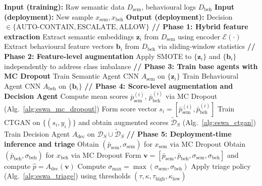 \begin{algorithm}[ht]
\caption{Agentic SABRE: Training and Deployment Pipeline}
\label{alg:eswa_pipeline}
\begin{algorithmic}[1]
    \State \textbf{Input (training):} Raw semantic data $D_{\text{sem}}$, behavioural logs $D_{\text{beh}}$
    \State \textbf{Input (deployment):} New sample $x_{\text{sem}}, x_{\text{beh}}$
    \State \textbf{Output (deployment):} Decision $\in \{\text{AUTO-CONTAIN}, \text{ESCALATE}, \text{ALLOW}\}$
    \Statex \textbf{// Phase 1: Hybrid feature extraction}
    \State Extract semantic embeddings $\mathbf{z}_i$ from $D_{\text{sem}}$ using encoder $\mathcal{E}(\cdot)$
    \State Extract behavioural feature vectors $\mathbf{b}_i$ from $D_{\text{beh}}$ via sliding-window statistics
    \Statex \textbf{// Phase 2: Feature-level augmentation}
    \State Apply SMOTE to $\{\mathbf{z}_i\}$ and $\{\mathbf{b}_i\}$ independently to address class imbalance
    \Statex \textbf{// Phase 3: Train base agents with MC Dropout}
    \State Train Semantic Agent CNN $A_{\text{sem}}$ on $\{\mathbf{z}_i\}$
    \State Train Behavioural Agent CNN $A_{\text{beh}}$ on $\{\mathbf{b}_i\}$
    \Statex \textbf{// Phase 4: Score-level augmentation and Decision Agent}
        \State Compute mean scores $\bar{p}_{\text{sem}}^{(i)}$, $\bar{p}_{\text{beh}}^{(i)}$ via MC Dropout (Alg.~\ref{alg:eswa_mc_dropout})
        \State Form score vector $s_i = [\bar{p}_{\text{sem}}^{(i)}, \bar{p}_{\text{beh}}^{(i)}]$
    \EndFor
    \State Train CTGAN on $\{(s_i, y_i)\}$ and obtain augmented scores $\tilde{\mathcal{D}}_S$ (Alg.~\ref{alg:eswa_ctgan})
    \State Train Decision Agent $A_{\text{dec}}$ on $\mathcal{D}_S \cup \tilde{\mathcal{D}}_S$
    \Statex \textbf{// Phase 5: Deployment-time inference and triage}
    \State Obtain $(\bar{p}_{\text{sem}}, \sigma_{\text{sem}})$ for $x_{\text{sem}}$ via MC Dropout
    \State Obtain $(\bar{p}_{\text{beh}}, \sigma_{\text{beh}})$ for $x_{\text{beh}}$ via MC Dropout
    \State Form $\mathbf{v} = [\bar{p}_{\text{sem}}, \bar{p}_{\text{beh}}, \sigma_{\text{sem}}, \sigma_{\text{beh}}]$ and compute $\hat{p} = A_{\text{dec}}(\mathbf{v})$
    \State Compute $\sigma_{\max} = \max(\sigma_{\text{sem}}, \sigma_{\text{beh}})$
    \State Apply triage policy (Alg.~\ref{alg:eswa_triage}) using thresholds $(\tau, \kappa, \tau_{\text{high}}, \kappa_{\text{low}})$
\end{algorithmic}
\end{algorithm}

